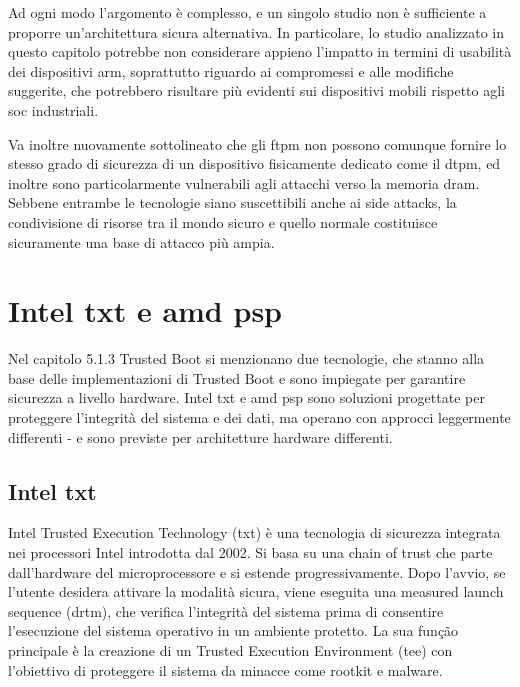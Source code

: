 Ad ogni modo l'argomento è complesso, e un singolo studio non è sufficiente a proporre un'architettura sicura alternativa. In particolare, lo studio analizzato in questo capitolo potrebbe non considerare appieno l'impatto in termini di usabilità dei dispositivi \acrshort{arm}, soprattutto riguardo ai compromessi e alle modifiche suggerite, che potrebbero risultare più evidenti sui dispositivi mobili rispetto agli \acrshort{soc} industriali.

Va inoltre nuovamente sottolineato che gli \acrshort{ftpm} non possono comunque fornire lo stesso grado di sicurezza di un dispositivo fisicamente dedicato come il \acrshort{dtpm}, ed inoltre sono particolarmente vulnerabili agli attacchi verso la memoria \acrshort{dram}. Sebbene entrambe le tecnologie siano suscettibili anche ai side attacks, la condivisione di risorse tra il mondo sicuro e quello normale costituisce sicuramente una base di attacco più ampia.

\section{\texorpdfstring{Intel \acrshort{txt} e \acrshort{amd} \acrshort{psp}}{Intel TXT e AMD PSP}}\label{sec:intel_txt_amd_psp}

Nel capitolo 5.1.3 Trusted Boot si menzionano due tecnologie, che stanno alla base delle implementazioni di Trusted Boot e sono impiegate per garantire sicurezza a livello hardware. Intel \acrshort{txt} e \acrshort{amd} \acrshort{psp} sono soluzioni progettate per proteggere l'integrità del sistema e dei dati, ma operano con approcci leggermente differenti - e sono previste per architetture hardware differenti.

\subsection{\texorpdfstring{Intel \acrshort{txt}}{Intel TXT}}\label{subsec:intel_txt}

Intel Trusted Execution Technology (\acrshort{txt}) è una tecnologia di sicurezza integrata nei processori Intel introdotta dal 2002. Si basa su una chain of trust che parte dall'hardware del microprocessore e si estende progressivamente. Dopo l'avvio, se l'utente desidera attivare la modalità sicura, viene eseguita una measured launch sequence (\acrshort{drtm}), che verifica l'integrità del sistema prima di consentire l'esecuzione del sistema operativo in un ambiente protetto. La sua função principale è la creazione di un Trusted Execution Environment (\acrshort{tee}) con l'obiettivo di proteggere il sistema da minacce come rootkit e malware.

